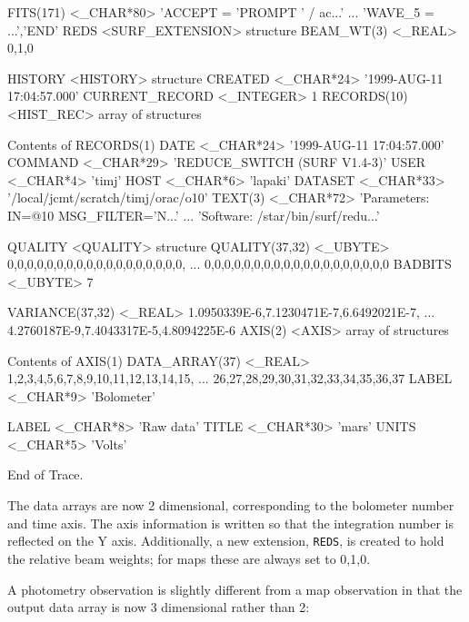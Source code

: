 \documentclass[twoside,11pt,nolof]{starlink}
\begin{document}
\begin{small}
\begin{terminalv}
      FITS(171)      <_CHAR*80>      'ACCEPT  = 'PROMPT  '           / ac...'
                                     ... 'WAVE_5  =                 ...','END'
      REDS           <SURF_EXTENSION>   {structure}
         BEAM_WT(3)     <_REAL>         0,1,0

   HISTORY        <HISTORY>       {structure}
      CREATED        <_CHAR*24>      '1999-AUG-11 17:04:57.000'
      CURRENT_RECORD  <_INTEGER>     1
      RECORDS(10)    <HIST_REC>      {array of structures}

      Contents of RECORDS(1)
         DATE           <_CHAR*24>      '1999-AUG-11 17:04:57.000'
         COMMAND        <_CHAR*29>      'REDUCE_SWITCH   (SURF V1.4-3)'
         USER           <_CHAR*4>       'timj'
         HOST           <_CHAR*6>       'lapaki'
         DATASET        <_CHAR*33>      '/local/jcmt/scratch/timj/orac/o10'
         TEXT(3)        <_CHAR*72>      'Parameters: IN=@10 MSG_FILTER='N...'
                                        ... 'Software: /star/bin/surf/redu...'

   QUALITY        <QUALITY>       {structure}
      QUALITY(37,32)  <_UBYTE>       0,0,0,0,0,0,0,0,0,0,0,0,0,0,0,0,0,0,
                                     ... 0,0,0,0,0,0,0,0,0,0,0,0,0,0,0,0,0,0,0
      BADBITS        <_UBYTE>        7

   VARIANCE(37,32)  <_REAL>       1.0950339E-6,7.1230471E-7,6.6492021E-7,
                                  ... 4.2760187E-9,7.4043317E-5,4.8094225E-6
   AXIS(2)        <AXIS>          {array of structures}

   Contents of AXIS(1)
      DATA_ARRAY(37)  <_REAL>        1,2,3,4,5,6,7,8,9,10,11,12,13,14,15,
                                     ... 26,27,28,29,30,31,32,33,34,35,36,37
      LABEL          <_CHAR*9>       'Bolometer'

   LABEL          <_CHAR*8>       'Raw data'
   TITLE          <_CHAR*30>      'mars'
   UNITS          <_CHAR*5>       'Volts'

End of Trace.
\end{terminalv}
\end{small}

The data arrays are now 2 dimensional, corresponding to the bolometer number
and time axis. The axis information is written so that the integration number
is reflected on the Y axis. Additionally, a new extension, \texttt{REDS}, is
created to hold the relative beam weights; for maps these are always set to 0,1,0.

A photometry observation is slightly different from a map observation in that
the output data array is now 3 dimensional rather than 2:
\end{document}
